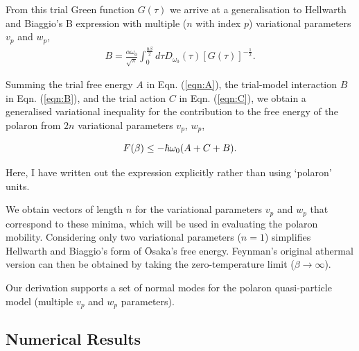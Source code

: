 From this trial Green function $G(\tau)$ we arrive at a generalisation to Hellwarth and Biaggio's B expression with multiple ($n$ with index $p$) variational parameters $v_{p}$ and $w_{p}$, 
\begin{equation}
\begin{gathered}
    B = \frac{\alpha \omega_0}{\sqrt{\pi}} \int_0^{\frac{\hbar\beta}{2}} d\tau D_{\omega_0}(\tau) \left[ G(\tau) \right]^{-\frac{1}{2}} .
\label{eqn:B}
\end{gathered}
\end{equation}

Summing the trial free energy $A$ in Eqn. (\ref{eqn:A}), the trial-model interaction $B$ in Eqn. (\ref{eqn:B}), and the trial action $C$ in Eqn. (\ref{eqn:C}), we obtain a generalised variational inequality for the contribution to the free energy of the polaron from $2n$ variational parameters $v_{p}$, $w_{p}$, 

\begin{equation}\label{eqn:multi_feynman_jensen}
        F(\beta) \leq - \hbar \omega_0 (A + C + B) . \\
\end{equation}

Here, I have written out the expression explicitly rather than using `polaron' units. 

We obtain vectors of length $n$ for the variational parameters $v_{p}$ and $w_{p}$ that correspond to these minima, which will be used in evaluating the polaron mobility. Considering only two variational parameters ($n = 1$) simplifies Hellwarth and Biaggio's form of \=Osaka's free energy. Feynman's original athermal version can then be obtained by taking the zero-temperature limit ($\beta \rightarrow \infty$).

Our derivation supports a set of normal modes for the polaron quasi-particle model (multiple $v_{p}$ and $w_{p}$ parameters).

\subsection{Numerical Results}

